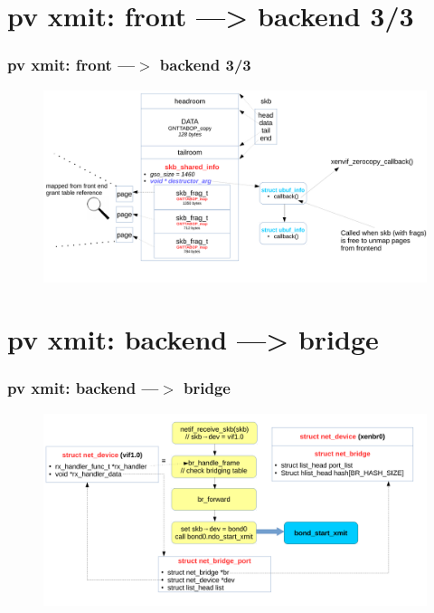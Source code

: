 \documentclass[aspectratio=169]{beamer}
\begin{document}
\section{pv xmit: front ---> backend 3/3}
\begin{frame}
\frametitle{pv xmit: front ---$>$ backend 3/3}
\begin{figure}
\includegraphics[width=1.0\linewidth]{figures/skb_destruct.pdf}
\end{figure}
\end{frame}



\section{pv xmit: backend ---> bridge}
\begin{frame}
\frametitle{pv xmit: backend ---$>$ bridge}
\begin{figure}
\includegraphics[width=1.0\linewidth]{figures/vif_to_bridge.pdf}
\end{figure}
\end{frame}

\end{document}
